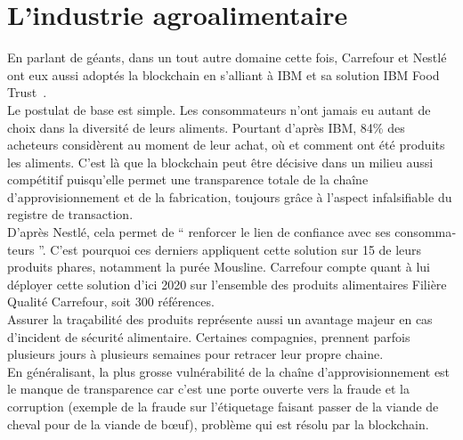 \documentclass[12pt, a4paper, oneside]{book}
\begin{document}
    \section{L'industrie agroalimentaire}

    En parlant de géants, dans un tout autre domaine cette fois, Carrefour et Nestlé ont eux aussi adoptés la blockchain en s’alliant à IBM et sa solution IBM Food Trust~\cite{IBMfood}.
    \\
    Le postulat de base est simple. Les consommateurs n’ont jamais eu autant de choix dans la diversité de leurs aliments. Pourtant d’après IBM, 84\% des acheteurs considèrent au moment de leur achat, où et comment ont été produits les aliments. C’est là que la blockchain peut être décisive dans un milieu aussi compétitif puisqu'elle permet une transparence totale de la chaîne d’approvisionnement et de la fabrication, toujours grâce à l’aspect infalsifiable du registre de transaction.
    \\
    D’après Nestlé, cela permet de \hyphenquote{french}{ renforcer le lien de confiance avec ses consommateurs }. C’est pourquoi ces derniers appliquent cette solution sur 15 de leurs produits phares, notamment la purée Mousline. Carrefour compte quant à lui déployer cette solution d’ici 2020 sur l’ensemble des produits alimentaires Filière Qualité Carrefour, soit 300 références.
    \\
    Assurer la traçabilité des produits représente aussi un avantage majeur en cas d’incident de sécurité alimentaire. Certaines compagnies, prennent parfois plusieurs jours à plusieurs semaines pour retracer leur propre chaine.
    \\
    En généralisant, la plus grosse vulnérabilité de la chaîne d’approvisionnement est le manque de transparence car c'est une porte ouverte vers la fraude et la corruption (exemple de la fraude sur l’étiquetage faisant passer de la viande de cheval pour de la viande de bœuf), problème qui est résolu par la blockchain.
\end{document}
